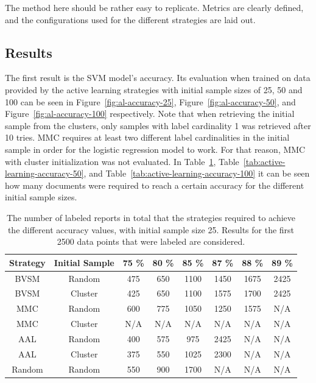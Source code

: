 The method here should be rather easy to replicate.
Metrics are clearly defined, and the configurations used for the different strategies are laid out.

\subsection{Results}
\label{sec:experiments-exp1-results}

The first result is the SVM model's accuracy.
Its evaluation when trained on data provided by the active learning strategies with initial sample sizes of 25, 50 and 100 can be seen in Figure~\ref{fig:al-accuracy-25}, Figure~\ref{fig:al-accuracy-50}, and Figure~\ref{fig:al-accuracy-100} respectively.
Note that when retrieving the initial sample from the clusters, only samples with label cardinality 1 was retrieved after 10 tries.
MMC requires at least two different label cardinalities in the initial sample in order for the logistic regression model to work.
For that reason, MMC with cluster initialization was not evaluated.
In Table~\ref{tab:active-learning-accuracy-25}, Table~\ref{tab:active-learning-accuracy-50}, and Table~\ref{tab:active-learning-accuracy-100} it can be seen how many documents were required to reach a certain accuracy for the different initial sample sizes.


\begin{table}
    \centering
    \begin{tabular}{|cccccccc|}
        \hline
        \textbf{Strategy} & \textbf{Initial Sample} & \textbf{75 \%} & \textbf{80 \%} & \textbf{85 \%} & \textbf{87 \%} & \textbf{88 \%} & \textbf{89 \%}\\
        \hline
        BVSM & Random & 475 & 650 & 1100 & 1450 & 1675 & 2425\\
        BVSM & Cluster & 425 & 650 & 1100 & 1575 & 1700 & 2425\\
        MMC & Random & 600 & 775 & 1050 & 1250 & 1575 & N/A\\
        MMC & Cluster & N/A & N/A & N/A & N/A & N/A & N/A\\
        AAL & Random & 400 & 575 & 975 & 2425 & N/A & N/A\\
        AAL & Cluster & 375 & 550 & 1025 & 2300 & N/A & N/A\\
        Random & Random & 550 & 900 & 1700 & N/A & N/A & N/A\\
        \hline
    \end{tabular}
    \caption{The number of labeled reports in total that the strategies required to achieve the different accuracy values, with initial sample size 25. Results for the first 2500 data points that were labeled are considered.}
    \label{tab:active-learning-accuracy-25}
\end{table}

